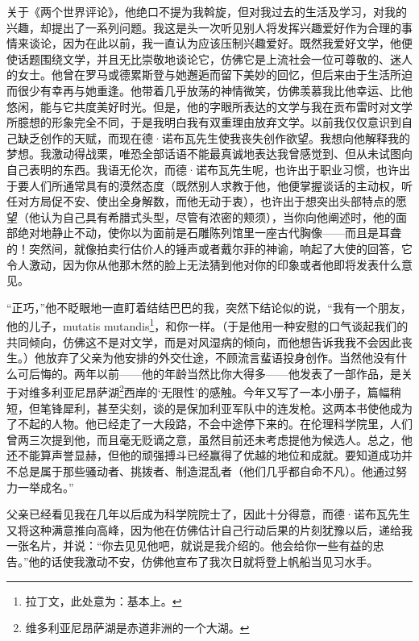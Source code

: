 \par 关于《两个世界评论》，他绝口不提为我斡旋，但对我过去的生活及学习，对我的兴趣，却提出了一系列问题。我这是头一次听见别人将发挥兴趣爱好作为合理的事情来谈论，因为在此以前，我一直认为应该压制兴趣爱好。既然我爱好文学，他便使话题围绕文学，并且无比崇敬地谈论它，仿佛它是上流社会一位可尊敬的、迷人的女士。他曾在罗马或德累斯登与她邂逅而留下美妙的回忆，但后来由于生活所迫而很少有幸再与她重逢。他带着几乎放荡的神情微笑，仿佛羡慕我比他幸运、比他悠闲，能与它共度美好时光。但是，他的字眼所表达的文学与我在贡布雷时对文学所臆想的形象完全不同，于是我明白我有双重理由放弃文学。以前我仅仅意识到自己缺乏创作的天赋，而现在德·诺布瓦先生使我丧失创作欲望。我想向他解释我的梦想。我激动得战栗，唯恐全部话语不能最真诚地表达我曾感觉到、但从未试图向自己表明的东西。我语无伦次，而德·诺布瓦先生呢，也许出于职业习惯，也许出于要人们所通常具有的漠然态度（既然别人求教于他，他便掌握谈话的主动权，听任对方局促不安、使出全身解数，而他无动于衷），也许出于想突出头部特点的愿望（他认为自己具有希腊式头型，尽管有浓密的颊须），当你向他阐述时，他的面部绝对地静止不动，使你以为面前是石雕陈列馆里一座古代胸像——而且是耳聋的！突然间，就像拍卖行估价人的锤声或者戴尔菲的神谕，响起了大使的回答，它令人激动，因为你从他那木然的脸上无法猜到他对你的印象或者他即将发表什么意见。
\par “正巧，”他不眨眼地一直盯着结结巴巴的我，突然下结论似的说，“我有一个朋友，他的儿子，mutatis mutandis\footnote{拉丁文，此处意为：基本上。}，和你一样。（于是他用一种安慰的口气谈起我们的共同倾向，仿佛这不是对文学，而是对风湿病的倾向，而他想告诉我我不会因此丧生。）他放弃了父亲为他安排的外交仕途，不顾流言蜚语投身创作。当然他没有什么可后悔的。两年以前——他的年龄当然比你大得多——他发表了一部作品，是关于对维多利亚尼昂萨湖\footnote{维多利亚尼昂萨湖是赤道非洲的一个大湖。}西岸的‘无限性’的感触。今年又写了一本小册子，篇幅稍短，但笔锋犀利，甚至尖刻，谈的是保加利亚军队中的连发枪。这两本书使他成为了不起的人物。他已经走了一大段路，不会中途停下来的。在伦理科学院里，人们曾两三次提到他，而且毫无贬谪之意，虽然目前还未考虑提他为候选人。总之，他还不能算声誉显赫，但他的顽强搏斗已经赢得了优越的地位和成就。要知道成功并不总是属于那些骚动者、挑拨者、制造混乱者（他们几乎都自命不凡）。他通过努力一举成名。”
\par 父亲已经看见我在几年以后成为科学院院士了，因此十分得意，而德·诺布瓦先生又将这种满意推向高峰，因为他在仿佛估计自己行动后果的片刻犹豫以后，递给我一张名片，并说：“你去见见他吧，就说是我介绍的。他会给你一些有益的忠告。”他的话使我激动不安，仿佛他宣布了我次日就将登上帆船当见习水手。
